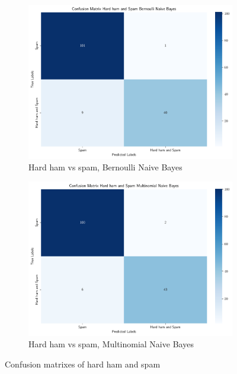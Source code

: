\documentclass[a4paper]{article}
\begin{document}
\begin{figure}
  \centering
  \begin{subfigure}[a]{\textwidth}
      \centering
      \includegraphics[width=\textwidth]{hard_ham_and_spam_bernoulli_naive_bayes_confusion_matrix.pdf}
      \caption{Hard ham vs spam, Bernoulli Naive Bayes}
      \label{fig:hard_ham_and_spam_bernoulli_naive_bayes_confusion_matrix}
  \end{subfigure}
  \vfill
  \begin{subfigure}[b]{\textwidth}
      \centering
      \includegraphics[width=\textwidth]{hard_ham_and_spam_multinomial_naive_bayes_confusion_matrix.pdf}
      \caption{Hard ham vs spam, Multinomial Naive Bayes}
      \label{fig:hard_ham_and_spam_multinomial_naive_bayes_confusion_matrix}
  \end{subfigure}
  \caption{Confusion matrixes of hard ham and spam}
  \label{fig:hard_ham_and_spam_confusion_matrix}
\end{figure}
\end{document}
